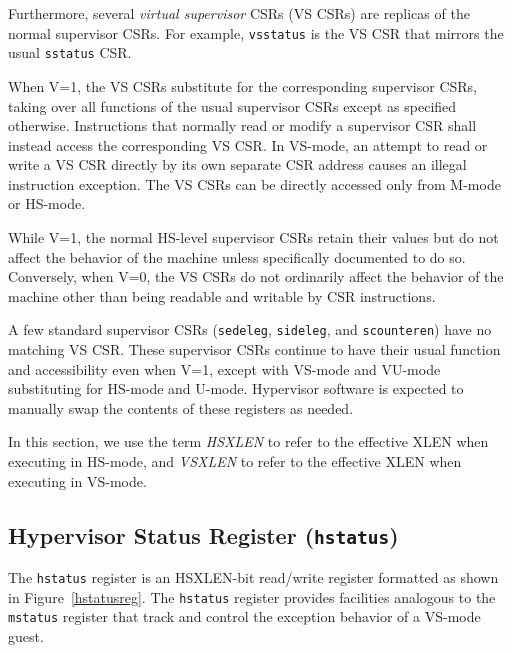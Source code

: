 Furthermore, several {\em virtual supervisor} CSRs (VS CSRs) are replicas
of the normal supervisor CSRs.
For example, {\tt vsstatus} is the VS CSR that mirrors the usual
{\tt sstatus} CSR.

When V=1, the VS CSRs substitute for the corresponding supervisor CSRs,
taking over all functions of the usual supervisor CSRs except as specified
otherwise.
Instructions that normally read or modify a supervisor CSR shall instead
access the corresponding VS CSR.
In VS-mode, an attempt to read or write a VS CSR directly by its own
separate CSR address causes an illegal instruction exception.
The VS CSRs can be directly accessed only from M-mode or HS-mode.

While V=1, the normal HS-level supervisor CSRs retain their values but do
not affect the behavior of the machine unless specifically documented to
do so.
Conversely, when V=0, the VS CSRs do not ordinarily affect the behavior of
the machine other than being readable and writable by CSR instructions.

A few standard supervisor CSRs ({\tt sedeleg}, {\tt sideleg},
and {\tt scounteren}) have no matching VS CSR.
These supervisor CSRs continue to have their usual function and
accessibility even when V=1, except with VS-mode and VU-mode substituting
for HS-mode and U-mode.
Hypervisor software is expected to manually swap the contents of these
registers as needed.

In this section, we use the term {\em HSXLEN} to refer to the effective XLEN
when executing in HS-mode, and {\em VSXLEN} to refer to the effective
XLEN when executing in VS-mode.

\subsection{Hypervisor Status Register ({\tt hstatus})}

The {\tt hstatus} register is an HSXLEN-bit read/write register
formatted as shown in Figure~\ref{hstatusreg}.  The {\tt hstatus}
register provides facilities analogous to the {\tt mstatus} register
that track and control the exception behavior of a VS-mode guest.

